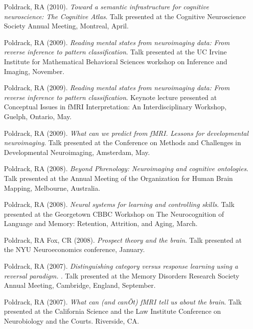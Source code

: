 Poldrack, RA (2010). \emph{Toward a semantic infrastructure for cognitive neuroscience: The Cognitive Atlas}. Talk presented at the Cognitive Neuroscience Society Annual Meeting, Montreal, April. \vspace{2mm} 

Poldrack, RA (2009). \emph{Reading mental states from neuroimaging data: From reverse inference to pattern classification}. Talk presented at the UC Irvine Institute for Mathematical Behavioral Sciences workshop on Inference and Imaging, November. \vspace{2mm} 

Poldrack, RA (2009). \emph{Reading mental states from neuroimaging data: From reverse inference to pattern classification}. Keynote lecture presented at Conceptual Issues in fMRI Interpretation: An Interdisciplinary Workshop, Guelph, Ontario, May. \vspace{2mm} 

Poldrack, RA (2009). \emph{What can we predict from fMRI. Lessons for developmental neuroimaging}. Talk presented at the Conference on Methods and Challenges in Developmental Neuroimaging, Amsterdam, May. \vspace{2mm} 

Poldrack, RA (2008). \emph{Beyond Phrenology: Neuroimaging and cognitive ontologies}. Talk presented at the Annual Meeting of the Organization for Human Brain Mapping, Melbourne, Australia. \vspace{2mm} 

Poldrack, RA (2008). \emph{Neural systems for learning and controlling skills}. Talk presented at the Georgetown CBBC Workshop on The Neurocognition of Language and Memory: Retention, Attrition, and Aging, March. \vspace{2mm} 

Poldrack, RA  Fox, CR (2008). \emph{Prospect theory and the brain}. Talk presented at the NYU Neuroeconomics conference, January. \vspace{2mm} 

Poldrack, RA (2007). \emph{Distinguishing category versus response learning using a reversal paradigm. }. Talk presented at the Memory Disorders Research Society Annual Meeting, Cambridge, England, September. \vspace{2mm} 

Poldrack, RA (2007). \emph{What can (and can\~Ot) fMRI tell us about the brain}. Talk presented at the California Science and the Law Institute Conference on Neurobiology and the Courts. Riverside, CA. \vspace{2mm} 

